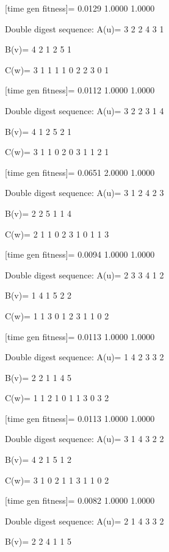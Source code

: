 [time gen fitness]=
    0.0129    1.0000    1.0000

Double digest sequence:
A(u)=
     3     2     2     4     3     1

B(v)=
     4     2     1     2     5     1

C(w)=
     3     1     1     1     1     0     2     2     3     0     1

[time gen fitness]=
    0.0112    1.0000    1.0000

Double digest sequence:
A(u)=
     3     2     2     3     1     4

B(v)=
     4     1     2     5     2     1

C(w)=
     3     1     1     0     2     0     3     1     1     2     1

[time gen fitness]=
    0.0651    2.0000    1.0000

Double digest sequence:
A(u)=
     3     1     2     4     2     3

B(v)=
     2     2     5     1     1     4

C(w)=
     2     1     1     0     2     3     1     0     1     1     3

[time gen fitness]=
    0.0094    1.0000    1.0000

Double digest sequence:
A(u)=
     2     3     3     4     1     2

B(v)=
     1     4     1     5     2     2

C(w)=
     1     1     3     0     1     2     3     1     1     0     2

[time gen fitness]=
    0.0113    1.0000    1.0000

Double digest sequence:
A(u)=
     1     4     2     3     3     2

B(v)=
     2     2     1     1     4     5

C(w)=
     1     1     2     1     0     1     1     3     0     3     2

[time gen fitness]=
    0.0113    1.0000    1.0000

Double digest sequence:
A(u)=
     3     1     4     3     2     2

B(v)=
     4     2     1     5     1     2

C(w)=
     3     1     0     2     1     1     3     1     1     0     2

[time gen fitness]=
    0.0082    1.0000    1.0000

Double digest sequence:
A(u)=
     2     1     4     3     3     2

B(v)=
     2     2     4     1     1     5

